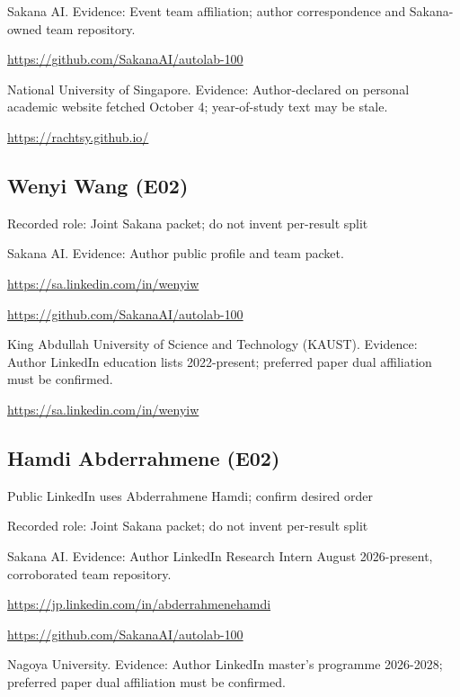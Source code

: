 \documentclass[11pt,a4paper]{article}
\begin{document}
Sakana AI. Evidence: Event team affiliation; author correspondence and Sakana-owned team repository.

{\small \url{https://github.com/SakanaAI/autolab-100}\par}

National University of Singapore. Evidence: Author-declared on personal academic website fetched October 4; year-of-study text may be stale.

{\small \url{https://rachtsy.github.io/}\par}

\subsection{Wenyi Wang (E02)}
Recorded role: Joint Sakana packet; do not invent per-result split

Sakana AI. Evidence: Author public profile and team packet.

{\small \url{https://sa.linkedin.com/in/wenyiw}\par}

{\small \url{https://github.com/SakanaAI/autolab-100}\par}

King Abdullah University of Science and Technology (KAUST). Evidence: Author LinkedIn education lists 2022-present; preferred paper dual affiliation must be confirmed.

{\small \url{https://sa.linkedin.com/in/wenyiw}\par}

\subsection{Hamdi Abderrahmene (E02)}
Public LinkedIn uses Abderrahmene Hamdi; confirm desired order

Recorded role: Joint Sakana packet; do not invent per-result split

Sakana AI. Evidence: Author LinkedIn Research Intern August 2026-present, corroborated team repository.

{\small \url{https://jp.linkedin.com/in/abderrahmenehamdi}\par}

{\small \url{https://github.com/SakanaAI/autolab-100}\par}

Nagoya University. Evidence: Author LinkedIn master's programme 2026-2028; preferred paper dual affiliation must be confirmed.
\end{document}
